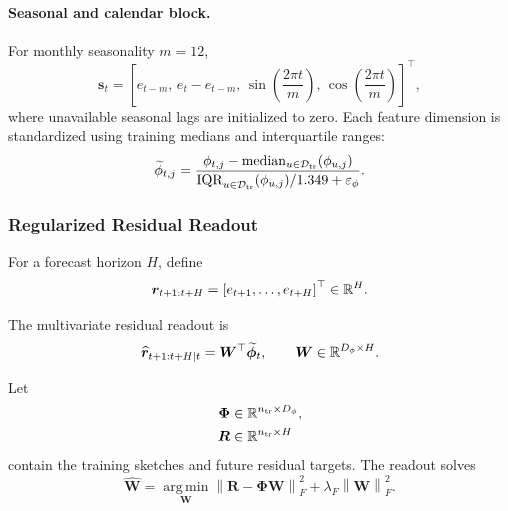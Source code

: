 \documentclass[review,number,sort&compress]{elsarticle}
\begin{document}
\paragraph{Seasonal and calendar block.}

For monthly seasonality $m=12$,
\begin{equation}
    \bm{s}_t
    =
    \left[
    e_{t-m},\,
    e_t-e_{t-m},\,
    \sin\left(\frac{2\pi t}{m}\right),\,
    \cos\left(\frac{2\pi t}{m}\right)
    \right]^\top,
    \label{eq:seasonal_sketch}
\end{equation}
where unavailable seasonal lags are initialized to zero.
Each feature dimension is standardized using training medians and interquartile
ranges:
\begin{equation}
    \widetilde{\phi}_{t,j}
    =
    \frac{
        \phi_{t,j}
        -
        \operatorname{median}_{u\in\mathcal{D}_{\mathrm{tr}}}(\phi_{u,j})
    }{
        \operatorname{IQR}_{u\in\mathcal{D}_{\mathrm{tr}}}(\phi_{u,j})/1.349+\varepsilon_\phi
    }.
    \label{eq:fast_robust_scaling}
\end{equation}

\subsubsection{Regularized Residual Readout}

For a forecast horizon $H$, define
\begin{equation}
    \bm{r}_{t+1:t+H}
    =
    \left[
    e_{t+1},\ldots,e_{t+H}
    \right]^\top
    \in\mathbb{R}^H.
\end{equation}

The multivariate residual readout is
\begin{equation}
    \widehat{\bm{r}}_{t+1:t+H|t}
    =
    \bm{W}^{\top}
    \widetilde{\bm{\phi}}_t,
    \qquad
    \bm{W}\in\mathbb{R}^{D_\phi\times H}.
\end{equation}

Let
\begin{align}
    \bm{\Phi}
    &\in
    \mathbb{R}^{n_{\mathrm{tr}}\times D_\phi},
    \\
    \bm{R}
    &\in
    \mathbb{R}^{n_{\mathrm{tr}}\times H}
\end{align}
contain the training sketches and future residual targets. The readout solves
\begin{equation}
    \widehat{\bm{W}}
    =
    \operatorname*{arg\,min}_{\bm{W}}
    \left\|
    \bm{R}-\bm{\Phi}\bm{W}
    \right\|_F^2
    +
    \lambda_F
    \left\|
    \bm{W}
    \right\|_F^2.
    \label{eq:fast_ridge_objective}
\end{equation}
\end{document}
